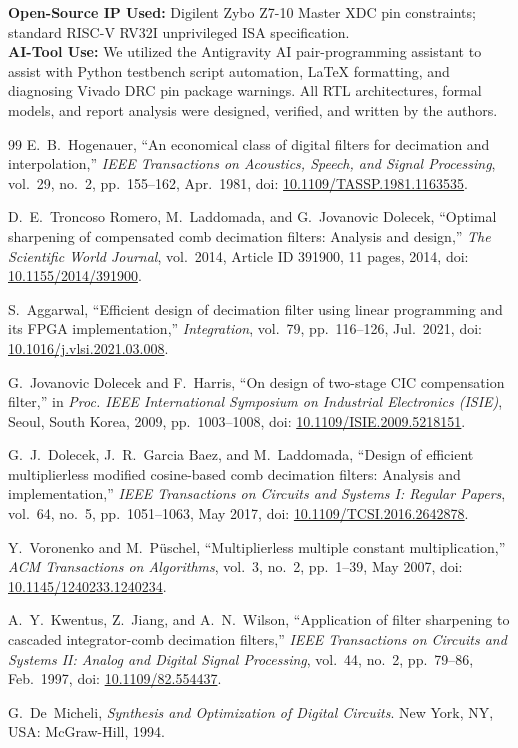 \documentclass[11pt,a4paper]{article}
\begin{document}
\textbf{Open-Source IP Used:} Digilent Zybo Z7-10 Master XDC pin constraints; standard RISC-V RV32I unprivileged ISA specification.\\
\textbf{AI-Tool Use:} We utilized the Antigravity AI pair-programming assistant to assist with Python testbench script automation, LaTeX formatting, and diagnosing Vivado DRC pin package warnings. All RTL architectures, formal models, and report analysis were designed, verified, and written by the authors.

\begin{thebibliography}{99}
E.~B.~Hogenauer, ``An economical class of digital filters for decimation and interpolation,'' \emph{IEEE Transactions on Acoustics, Speech, and Signal Processing}, vol.~29, no.~2, pp.~155--162, Apr.~1981, doi: \href{https://doi.org/10.1109/TASSP.1981.1163535}{10.1109/TASSP.1981.1163535}.

D.~E.~Troncoso Romero, M.~Laddomada, and G.~Jovanovic Dolecek, ``Optimal sharpening of compensated comb decimation filters: Analysis and design,'' \emph{The Scientific World Journal}, vol.~2014, Article ID 391900, 11 pages, 2014, doi: \href{https://doi.org/10.1155/2014/391900}{10.1155/2014/391900}.

S.~Aggarwal, ``Efficient design of decimation filter using linear programming and its FPGA implementation,'' \emph{Integration}, vol.~79, pp.~116--126, Jul.~2021, doi: \href{https://doi.org/10.1016/j.vlsi.2021.03.008}{10.1016/j.vlsi.2021.03.008}.

G.~Jovanovic Dolecek and F.~Harris, ``On design of two-stage CIC compensation filter,'' in \emph{Proc. IEEE International Symposium on Industrial Electronics (ISIE)}, Seoul, South Korea, 2009, pp.~1003--1008, doi: \href{https://doi.org/10.1109/ISIE.2009.5218151}{10.1109/ISIE.2009.5218151}.

G.~J.~Dolecek, J.~R.~Garcia Baez, and M.~Laddomada, ``Design of efficient multiplierless modified cosine-based comb decimation filters: Analysis and implementation,'' \emph{IEEE Transactions on Circuits and Systems I: Regular Papers}, vol.~64, no.~5, pp.~1051--1063, May 2017, doi: \href{https://doi.org/10.1109/TCSI.2016.2642878}{10.1109/TCSI.2016.2642878}.

Y.~Voronenko and M.~P\"uschel, ``Multiplierless multiple constant multiplication,'' \emph{ACM Transactions on Algorithms}, vol.~3, no.~2, pp.~1--39, May 2007, doi: \href{https://doi.org/10.1145/1240233.1240234}{10.1145/1240233.1240234}.

A.~Y.~Kwentus, Z.~Jiang, and A.~N.~Wilson, ``Application of filter sharpening to cascaded integrator-comb decimation filters,'' \emph{IEEE Transactions on Circuits and Systems II: Analog and Digital Signal Processing}, vol.~44, no.~2, pp.~79--86, Feb.~1997, doi: \href{https://doi.org/10.1109/82.554437}{10.1109/82.554437}.

G.~De~Micheli, \emph{Synthesis and Optimization of Digital Circuits}. New York, NY, USA: McGraw-Hill, 1994.
\end{thebibliography}
\end{document}
